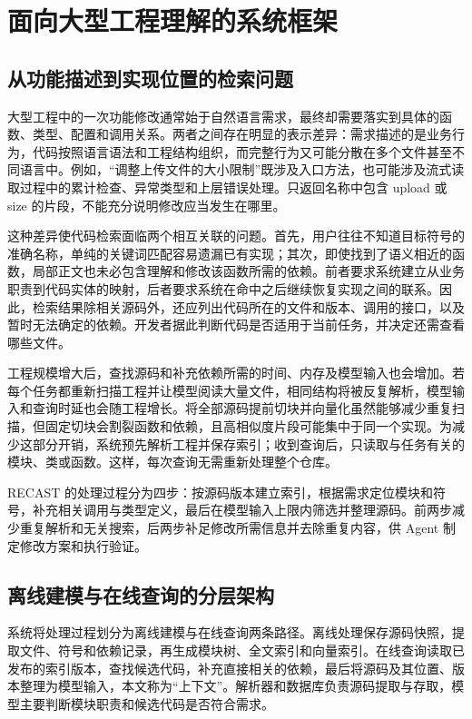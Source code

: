 \chapter{面向大型工程理解的系统框架}
\label{chap:architecture}
\label{chap:challenges}

\section{从功能描述到实现位置的检索问题}

大型工程中的一次功能修改通常始于自然语言需求，最终却需要落实到具体的函数、类型、配置和调用关系。两者之间存在明显的表示差异：需求描述的是业务行为，代码按照语言语法和工程结构组织，而完整行为又可能分散在多个文件甚至不同语言中。例如，“调整上传文件的大小限制”既涉及入口方法，也可能涉及流式读取过程中的累计检查、异常类型和上层错误处理。只返回名称中包含 upload 或 size 的片段，不能充分说明修改应当发生在哪里。

这种差异使代码检索面临两个相互关联的问题。首先，用户往往不知道目标符号的准确名称，单纯的关键词匹配容易遗漏已有实现；其次，即使找到了语义相近的函数，局部正文也未必包含理解和修改该函数所需的依赖。前者要求系统建立从业务职责到代码实体的映射，后者要求系统在命中之后继续恢复实现之间的联系。因此，检索结果除相关源码外，还应列出代码所在的文件和版本、调用的接口，以及暂时无法确定的依赖。开发者据此判断代码是否适用于当前任务，并决定还需查看哪些文件。

工程规模增大后，查找源码和补充依赖所需的时间、内存及模型输入也会增加。若每个任务都重新扫描工程并让模型阅读大量文件，相同结构将被反复解析，模型输入和查询时延也会随工程增长。将全部源码提前切块并向量化虽然能够减少重复扫描，但固定切块会割裂函数和依赖，且高相似度片段可能集中于同一个实现。为减少这部分开销，系统预先解析工程并保存索引；收到查询后，只读取与任务有关的模块、类或函数。这样，每次查询无需重新处理整个仓库。

RECAST 的处理过程分为四步：按源码版本建立索引，根据需求定位模块和符号，补充相关调用与类型定义，最后在模型输入上限内筛选并整理源码。前两步减少重复解析和无关搜索，后两步补足修改所需信息并去除重复内容，供 Agent 制定修改方案和执行验证。

\section{离线建模与在线查询的分层架构}

系统将处理过程划分为离线建模与在线查询两条路径。离线处理保存源码快照，提取文件、符号和依赖记录，再生成模块树、全文索引和向量索引。在线查询读取已发布的索引版本，查找候选代码，补充直接相关的依赖，最后将源码及其位置、版本整理为模型输入，本文称为“上下文”。解析器和数据库负责源码提取与存取，模型主要判断模块职责和候选代码是否符合需求。


